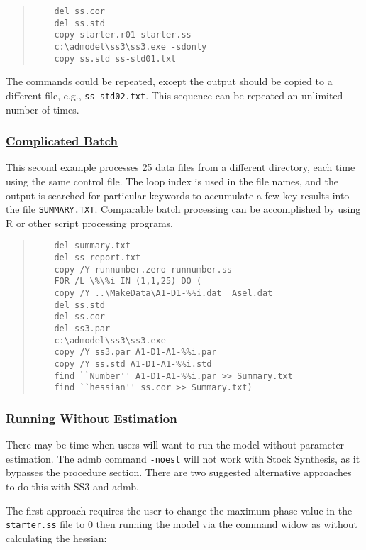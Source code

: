 \begin{quote}
	\begin{verbatim}
	del ss.cor
	del ss.std
	copy starter.r01 starter.ss
	c:\admodel\ss3\ss3.exe -sdonly
	copy ss.std ss-std01.txt
	\end{verbatim}
\end{quote}

The commands could be repeated, except the output should be copied to a different file, e.g., \texttt{ss-std02.txt}. This sequence can be repeated an unlimited number of times.

\hypertarget{ComplexBatch}{}
\subsubsection[Complicated Batch]{\protect\hyperlink{ComplexBatch}{Complicated Batch}}
This second example processes 25 data files from a different directory, each time using the same control file. The loop index is used in the file names, and the output is searched for particular keywords to accumulate a few key results into the file \texttt{SUMMARY.TXT}. Comparable batch processing can be accomplished by using R or other script processing programs.

\begin{quote}
	\begin{verbatim}
	del summary.txt
	del ss-report.txt
	copy /Y runnumber.zero runnumber.ss
	FOR /L \%\%i IN (1,1,25) DO (
	copy /Y ..\MakeData\A1-D1-%%i.dat  Asel.dat
	del ss.std
	del ss.cor
	del ss3.par
	c:\admodel\ss3\ss3.exe
	copy /Y ss3.par A1-D1-A1-%%i.par
	copy /Y ss.std A1-D1-A1-%%i.std
	find ``Number'' A1-D1-A1-%%i.par >> Summary.txt
	find ``hessian'' ss.cor >> Summary.txt)
	\end{verbatim}
\end{quote}


\hypertarget{NoEst}{}
\subsubsection[Running Without Estimation]{\protect\hyperlink{NoEst}{Running Without Estimation}}
There may be time when users will want to run the model without parameter estimation. The \gls{admb} command \texttt{-noest} will not work with Stock Synthesis, as it bypasses the procedure section. There are two suggested alternative approaches to do this with SS3 and \gls{admb}.  

The first approach requires the user to change the maximum phase value in the \texttt{starter.ss} file to 0 then running the model via the command widow as without calculating the hessian:

